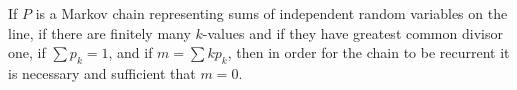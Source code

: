 If $P$ is a Markov chain representing sums of independent random variables on the line, if there are finitely many $k$-values and if they have greatest common divisor one, if $\sum p_k = 1$, and if $m = \sum kp_k$, then in order for the chain to be recurrent it is necessary and sufficient that $m = 0$.
